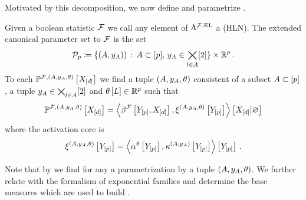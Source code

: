 Motivated by this decomposition, we now define and parametrize \HybridLogicNetworks{}.

\begin{definition}[\HybridLogicNetwork{}]
    \label{def:hybridLogicNetwork}
    Given a boolean statistic $\mathcal{F}$ we call any element of $\Lambda^{\mathcal{F},\mathrm{EL}}$ a \HybridLogicNetwork{} (HLN).
    The extended canonical parameter set to $\mathcal{F}$ is the set
    \begin{align*}
        \mathcal{P}_{p}\coloneqq
        \{(A,y_{A}))\,:\, A\subset[p],\, y_{A}\in\bigtimes_{l\in A}[2]\} \times \mathbb{R}^{p} \, .
    \end{align*}
    To each \HybridLogicNetwork{} $\mathbb{P}^{\mathcal{F},(A,y_{A},\theta)}\left[X_{[d]}\right]$ we find a tuple $(A,y_{A},\theta)$ consistent of a subset $A\subset[p]$, a tuple $y_{A}\in\bigtimes_{l\in A}[2]$ and $\theta\left[L\right]\in\mathbb{R}^{p}$ such that
    \begin{align*}
        \mathbb{P}^{\mathcal{F},(A,y_{A},\theta)}\left[X_{[d]}\right]
        = \left\langle \beta^{\mathcal{F}}\left[Y_{[p]},X_{[d]}\right],\xi^{(A,y_{A},\theta)}\left[Y_{[p]}\right]\right\rangle \left[ X_{[d]} | \varnothing \right]
    \end{align*}
    where the activation core is
    \begin{align*}
        \xi^{(A,y_{A},\theta)}\left[Y_{[p]}\right] = \left\langle \alpha^\theta\left[Y_{[p]}\right],\kappa^{(A,y_{A})}\left[Y_{[p]}\right]\right\rangle \left[ Y_{[p]} \right] \, .
    \end{align*}
\end{definition}

Note that by  we find for any \HybridLogicNetwork{} a parametrization by a tuple $(A,y_{A},\theta)$.
We further relate with the formalism of exponential families and determine the base measures which are used to build \HybridLogicNetworks{}.

